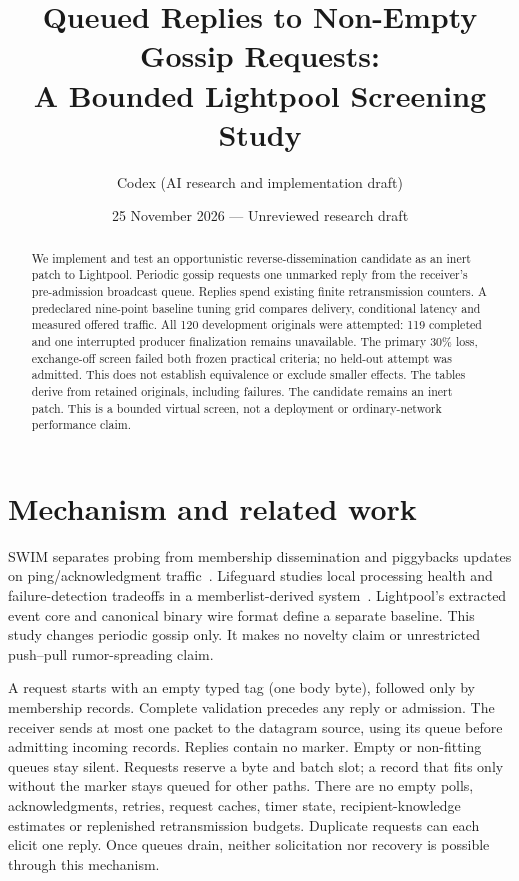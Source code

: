 \documentclass[10pt]{article}
\title{Queued Replies to Non-Empty Gossip Requests:\\A Bounded Lightpool Screening Study}
\author{Codex (AI research and implementation draft)}
\date{25 November 2026 --- Unreviewed research draft}
\begin{document}
\maketitle
\begin{abstract}
We implement and test an opportunistic reverse-dissemination candidate as
an inert patch to Lightpool. Periodic gossip requests one unmarked reply
from the receiver's pre-admission broadcast queue. Replies spend existing
finite retransmission counters. A predeclared nine-point baseline tuning
grid compares delivery, conditional latency and measured offered traffic.
All 120 development originals were attempted: 119 completed and one
interrupted producer finalization remains unavailable. The primary
30\% loss, exchange-off screen failed both frozen practical criteria;
no held-out attempt was admitted. This does not establish equivalence or
exclude smaller effects. The tables derive from retained originals,
including failures. The candidate remains an inert patch. This is a
bounded virtual screen, not a deployment or ordinary-network performance
claim.
\end{abstract}

\section{Mechanism and related work}
SWIM separates probing from membership dissemination and piggybacks updates
on ping/acknowledgment traffic~\cite{swim}. Lifeguard studies local processing
health and failure-detection tradeoffs in a memberlist-derived system~\cite{lifeguard}.
Lightpool's extracted event core and canonical binary wire format define a
separate baseline. This study changes periodic gossip only. It makes no
novelty claim or unrestricted push--pull rumor-spreading claim.

A request starts with an empty typed tag (one body byte), followed only by
membership records. Complete validation precedes any reply or admission.
The receiver sends at most one packet to the datagram source, using its
queue before admitting incoming records. Replies contain no marker. Empty
or non-fitting queues stay silent. Requests reserve a byte and batch slot;
a record that fits only without the marker stays queued for other paths.
There are no empty polls, acknowledgments, retries, request caches, timer
state, recipient-knowledge estimates or replenished retransmission budgets.
Duplicate requests can each elicit one reply. Once queues drain, neither
solicitation nor recovery is possible through this mechanism.
\end{document}

